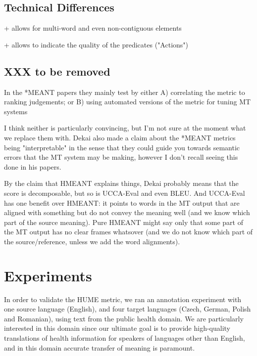 \documentclass[11pt]{article}
\begin{document}
\subsection{Technical Differences}

+ allows for multi-word and even non-contiguous elements

+ allows to indicate the quality of the predicates ("Actions")


\subsection{XXX to be removed}

In the *MEANT papers they mainly test by either
A) correlating the metric to ranking judgements; or
B) using automated versions of the metric for tuning MT systems

I think neither is particularly convincing, but I'm not sure at the moment what we replace them with. Dekai also made a claim about the *MEANT metrics being "interpretable" in the sense that they could guide you towards semantic errors that the MT system may be making, however I don't recall seeing this done in his papers. 

By the claim that HMEANT explains things, Dekai probably means that the score is decomposable, but so is UCCA-Eval and even BLEU. And UCCA-Eval has one benefit over HMEANT: it points to words in the MT output that are aligned with something but do not convey the meaning well (and we know which part of the source meaning). Pure HMEANT might say only that some part of the MT output has no clear frames whatsover (and we do not know which part of the source/reference, unless we add the word alignments).









\section{Experiments}\label{sec:experiments}


In order to validate the HUME metric, we ran an annotation experiment with one source language (English), and four 
target languages (Czech, German, Polish and Romanian), using text from the public health domain. We are 
particularly interested in this domain since our ultimate goal is to provide high-quality translations of health
information for speakers of languages other than English, and in this domain accurate transfer of meaning is
paramount.
\end{document}
